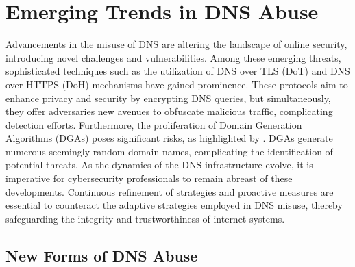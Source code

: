 \section{Emerging Trends in DNS Abuse}

Advancements in the misuse of DNS are altering the landscape of online security, introducing novel challenges and vulnerabilities. Among these emerging threats, sophisticated techniques such as the utilization of DNS over TLS (DoT) and DNS over HTTPS (DoH) mechanisms have gained prominence. These protocols aim to enhance privacy and security by encrypting DNS queries, but simultaneously, they offer adversaries new avenues to obfuscate malicious traffic, complicating detection efforts. Furthermore, the proliferation of Domain Generation Algorithms (DGAs) poses significant risks, as highlighted by \cite{kapoor2021ransomware}.  DGAs generate numerous seemingly random domain names, complicating the identification of potential threats. As the dynamics of the DNS infrastructure evolve, it is imperative for cybersecurity professionals to remain abreast of these developments. Continuous refinement of strategies and proactive measures are essential to counteract the adaptive strategies employed in DNS misuse, thereby safeguarding the integrity and trustworthiness of internet systems.

\subsection{New Forms of DNS Abuse}


